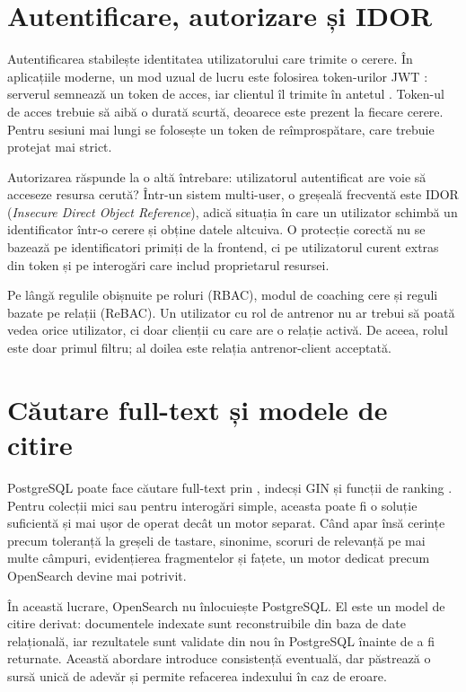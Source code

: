 \section{Autentificare, autorizare și IDOR}

Autentificarea stabilește identitatea utilizatorului care trimite o cerere. În aplicațiile moderne,
un mod uzual de lucru este folosirea token-urilor JWT \cite{rfc7519}: serverul semnează un token de
acces, iar clientul îl trimite în antetul . Token-ul de acces trebuie să aibă o
durată scurtă, deoarece este prezent la fiecare cerere. Pentru sesiuni mai lungi se folosește un token
de reîmprospătare, care trebuie protejat mai strict.

Autorizarea răspunde la o altă întrebare: utilizatorul autentificat are voie să acceseze resursa
cerută? Într-un sistem multi-user, o greșeală frecventă este IDOR (\emph{Insecure Direct Object
Reference}), adică situația în care un utilizator schimbă un identificator într-o cerere și obține
datele altcuiva. O protecție corectă nu se bazează pe identificatori primiți de la frontend, ci pe
utilizatorul curent extras din token și pe interogări care includ proprietarul resursei.

Pe lângă regulile obișnuite pe roluri (RBAC), modul de coaching cere și reguli bazate pe relații
(ReBAC). Un utilizator cu rol de antrenor nu ar trebui să poată vedea orice utilizator, ci doar
clienții cu care are o relație activă. De aceea, rolul este doar primul filtru; al doilea este
relația antrenor-client acceptată.

\section{Căutare full-text și modele de citire}

PostgreSQL poate face căutare full-text prin , indecși GIN și funcții de ranking
\cite{postgresFTS}. Pentru colecții mici sau pentru interogări simple, aceasta poate fi o soluție
suficientă și mai ușor de operat decât un motor separat. Când apar însă cerințe precum toleranță la
greșeli de tastare, sinonime, scoruri de relevanță pe mai multe câmpuri, evidențierea fragmentelor și
fațete, un motor dedicat precum OpenSearch \cite{opensearch} devine mai potrivit.

În această lucrare, OpenSearch nu înlocuiește PostgreSQL. El este un model de citire derivat:
documentele indexate sunt reconstruibile din baza de date relațională, iar rezultatele sunt validate
din nou în PostgreSQL înainte de a fi returnate. Această abordare introduce consistență eventuală,
dar păstrează o sursă unică de adevăr și permite refacerea indexului în caz de eroare.

